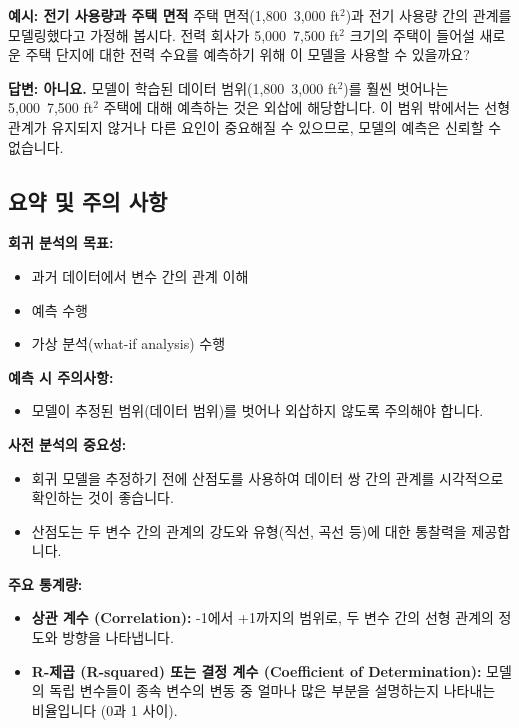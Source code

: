 \documentclass[11pt,a4paper]{book}
\theoremstyle{definition}
\begin{document}
\begin{examplebox}
\textbf{예시: 전기 사용량과 주택 면적}
주택 면적(1,800~3,000 ft$^2$)과 전기 사용량 간의 관계를 모델링했다고 가정해 봅시다. 전력 회사가 5,000~7,500 ft$^2$ 크기의 주택이 들어설 새로운 주택 단지에 대한 전력 수요를 예측하기 위해 이 모델을 사용할 수 있을까요?

\textbf{답변: 아니요.}
모델이 학습된 데이터 범위(1,800~3,000 ft$^2$)를 훨씬 벗어나는 5,000~7,500 ft$^2$ 주택에 대해 예측하는 것은 외삽에 해당합니다. 이 범위 밖에서는 선형 관계가 유지되지 않거나 다른 요인이 중요해질 수 있으므로, 모델의 예측은 신뢰할 수 없습니다.
\end{examplebox}

\subsection{요약 및 주의 사항}
\begin{summarybox}
\textbf{회귀 분석의 목표:}
\begin{itemize}
    \item 과거 데이터에서 변수 간의 관계 이해
    \item 예측 수행
    \item 가상 분석(what-if analysis) 수행
\end{itemize}
\textbf{예측 시 주의사항:}
\begin{itemize}
    \item 모델이 추정된 범위(데이터 범위)를 벗어나 외삽하지 않도록 주의해야 합니다.
\end{itemize}
\textbf{사전 분석의 중요성:}
\begin{itemize}
    \item 회귀 모델을 추정하기 전에 산점도를 사용하여 데이터 쌍 간의 관계를 시각적으로 확인하는 것이 좋습니다.
    \item 산점도는 두 변수 간의 관계의 강도와 유형(직선, 곡선 등)에 대한 통찰력을 제공합니다.
\end{itemize}
\textbf{주요 통계량:}
\begin{itemize}
    \item \textbf{상관 계수 (Correlation):} -1에서 +1까지의 범위로, 두 변수 간의 선형 관계의 정도와 방향을 나타냅니다.
    \item \textbf{R-제곱 (R-squared) 또는 결정 계수 (Coefficient of Determination):} 모델의 독립 변수들이 종속 변수의 변동 중 얼마나 많은 부분을 설명하는지 나타내는 비율입니다 (0과 1 사이).
\end{itemize}
\end{summarybox}
\end{document}
